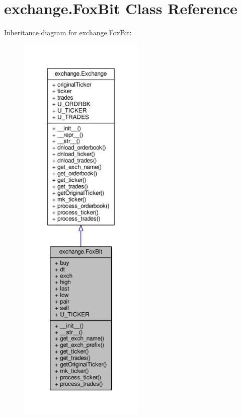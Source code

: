 \hypertarget{classexchange_1_1_fox_bit}{}\section{exchange.\+Fox\+Bit Class Reference}
\label{classexchange_1_1_fox_bit}


Inheritance diagram for exchange.\+Fox\+Bit\+:\nopagebreak
\begin{figure}[H]
\begin{center}
\leavevmode
\includegraphics[height=550pt]{classexchange_1_1_fox_bit__inherit__graph}
\end{center}
\end{figure}


